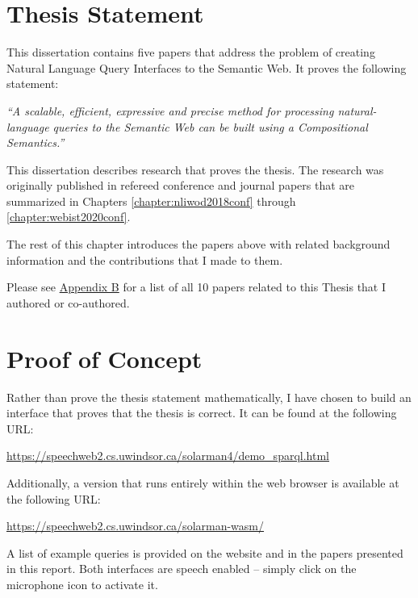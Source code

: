 \documentclass[../main.tex]{subfiles}
\begin{document}
\begin{refsection}







\section{Thesis Statement}

This dissertation contains five papers that address the problem of creating Natural Language Query Interfaces to the Semantic Web.  It proves the following statement:

\textit{``A scalable, efficient, expressive and precise method for processing natural-language queries to the Semantic Web can be built using a Compositional Semantics.''}

This dissertation describes research that proves the thesis. The research was originally published in refereed conference and journal papers that are summarized in Chapters \ref{chapter:nliwod2018conf} through \ref{chapter:webist2020conf}.

The rest of this chapter introduces the papers above with related background information and the contributions that I made to them. %

Please see \hyperref[appendix:b]{Appendix B} for a list of all 10 papers related to this Thesis that I authored or co-authored.

\section{Proof of Concept}

Rather than prove the thesis statement mathematically, I have chosen to build an interface that
proves that the thesis is correct.  It can be found at the following URL:

\begin{center}
    \url{https://speechweb2.cs.uwindsor.ca/solarman4/demo_sparql.html}
\end{center}
Additionally, a version that runs entirely within the web browser is available at
the following URL:
\begin{center}
    \url{https://speechweb2.cs.uwindsor.ca/solarman-wasm/}
\end{center}
A list of example queries is provided on the website and in the papers presented in this report.
Both interfaces are speech enabled -- simply click on the microphone icon to activate it.


\end{refsection}
\end{document}

